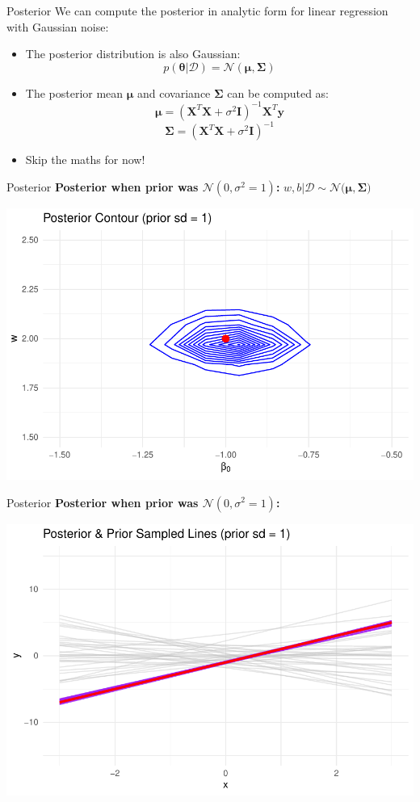 \documentclass{beamer}
\begin{document}
\begin{frame}{Posterior}
  We can compute the posterior in analytic form for linear regression with Gaussian noise:
  \begin{itemize}
  \item The posterior distribution is also Gaussian:
    \[
      p(\bm{\theta} | \mathcal{D}) = \mathcal{N}(\bm{\mu}, \bm{\Sigma})
    \]
  \item The posterior mean \(\bm{\mu}\) and covariance \(\bm{\Sigma}\) can be computed as:
    \[
      \bm{\mu} = (\bm{X}^T \bm{X} + \sigma^2 \bm{I})^{-1} \bm{X}^T \bm{y}
    \]
    \[
      \bm{\Sigma} = (\bm{X}^T \bm{X} + \sigma^2 \bm{I})^{-1}
    \]
  \item Skip the maths for now!
  \end{itemize}

\end{frame}

\begin{frame}{Posterior}
  \textbf{Posterior when prior was \(\mathcal{N}(0, \sigma^2=1)\):}
  \(
    w, b | \mathcal{D} \sim \mathcal{N}\big(\bm{\mu}, \bm{\Sigma}\big)
  \)

  \begin{center}
    \includegraphics[width=0.8\linewidth]{posterior_contour_1.pdf}
  \end{center}
\end{frame}

\begin{frame}{Posterior}
  \textbf{Posterior when prior was \(\mathcal{N}(0, \sigma^2=1)\):}

  \begin{center}
    \includegraphics[width=0.8\linewidth]{posterior_lines_1.pdf}
  \end{center}
\end{frame}
\end{document}
